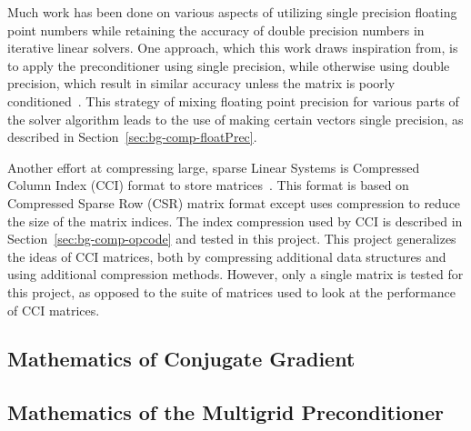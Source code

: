 Much work has been done on various aspects of utilizing single precision floating point numbers while retaining the accuracy of double precision numbers in iterative linear solvers.
One approach, which this work draws inspiration from, is to apply the preconditioner using single precision, while otherwise using double precision, which result in similar accuracy unless the matrix is poorly conditioned~\cite{Buttari:2008:mixedPrec, Hogg:2010:multiplePasses}.
This strategy of mixing floating point precision for various parts of the solver algorithm leads to the use of making certain vectors single precision, as described in Section~\ref{sec:bg-comp-floatPrec}.

Another effort at compressing large, sparse Linear Systems is Compressed Column Index (CCI) format to store matrices~\cite{Lawlor:2013:compression}.
This format is based on Compressed Sparse Row (CSR) matrix format except uses compression to reduce the size of the matrix indices.
The index compression used by CCI is described in Section~\ref{sec:bg-comp-opcode} and tested in this project.
This project generalizes the ideas of CCI matrices, both by compressing additional data structures and using additional compression methods.
However, only a single matrix is tested for this project, as opposed to the suite of matrices used to look at the performance of CCI matrices.

\subsection{Mathematics of Conjugate Gradient}


\subsection{Mathematics of the Multigrid Preconditioner}

